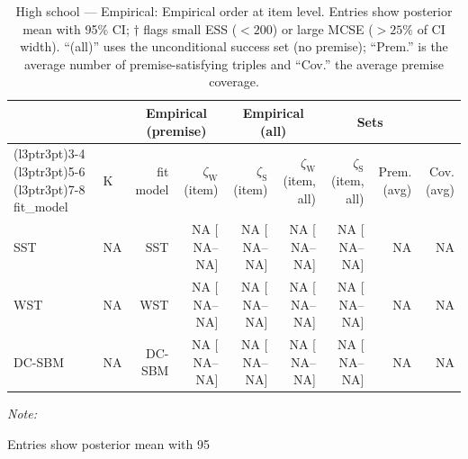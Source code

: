 \begin{table}
\centering
\caption{\label{tab:tab:high-school-empirical-emp-item}High school — Empirical: Empirical order at item level. Entries show posterior mean with 95\% CI; $\dagger$ flags small ESS ($<200$) or large MCSE ($>25\%$ of CI width). “(all)” uses the unconditional success set (no premise); “Prem.” is the average number of premise-satisfying triples and “Cov.” the average premise coverage.}
\centering
\begin{threeparttable}
\begin{tabular}[t]{llrrrrrrr}
\toprule
\multicolumn{2}{c}{ } & \multicolumn{2}{c}{Empirical (premise)} & \multicolumn{2}{c}{Empirical (all)} & \multicolumn{2}{c}{Sets} \\
\cmidrule(l{3pt}r{3pt}){3-4} \cmidrule(l{3pt}r{3pt}){5-6} \cmidrule(l{3pt}r{3pt}){7-8}
fit_model & K & fit model & $\zeta_{\mathrm{W}}$ (item) & $\zeta_{\mathrm{S}}$ (item) & $\zeta_{\mathrm{W}}$ (item, all) & $\zeta_{\mathrm{S}}$ (item, all) & Prem. (avg) & Cov. (avg)\\
\midrule
SST & NA & SST & NA [  NA--  NA] & NA [  NA--  NA] & NA [  NA--  NA] & NA [  NA--  NA] & NA & NA\\
WST & NA & WST & NA [  NA--  NA] & NA [  NA--  NA] & NA [  NA--  NA] & NA [  NA--  NA] & NA & NA\\
DC-SBM & NA & DC-SBM & NA [  NA--  NA] & NA [  NA--  NA] & NA [  NA--  NA] & NA [  NA--  NA] & NA & NA\\
\bottomrule
\end{tabular}
\begin{tablenotes}
\item \textit{Note: } 
\item Entries show posterior mean with 95%
\end{tablenotes}
\end{threeparttable}
\end{table}